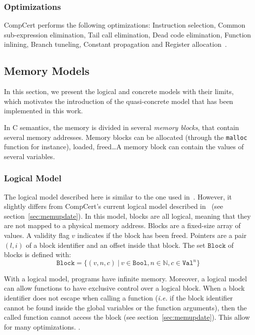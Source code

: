 \subsubsection{Optimizations}
CompCert performs the following optimizations:
Instruction selection, Common sub-expression elimination, Tail call elimination, Dead code elimination, Function inlining, Branch tuneling, Constant propagation and Register allocation~\cite{compcertoverview}.
 

\subsection{Memory Models}
\label{subsec:models}
In this section, we present the logical and concrete models with their limits, which motivates the introduction of the quasi-concrete model that has been implemented in this work.

In C semantics, the memory is divided in several \textit{memory blocks}, that contain several memory addresses. Memory blocks can be allocated (through the \texttt{malloc} function for instance), loaded, freed\dots A memory block can contain the values of several variables. 
\subsubsection{Logical Model}
The logical model described here is similar to the one used in~\cite{DBLP:conf/pldi/KangHMGZV15}. However, it slightly differs from CompCert's current logical model described in~\cite{leroy:hal-00703441} (see section~\ref{sec:memupdate}).
In this model, blocks are all logical, meaning that they are not mapped to a physical memory address.
Blocks are a fixed-size array of values.
A validity flag $v$ indicates if the block has been freed.
Pointers are a pair $(l,i)$ of a block identifier and an offset inside that block.
The set $\texttt{Block}$ of blocks is defined with:
$$\texttt{Block}=\{(v,n,c)~|~v\in\texttt{Bool},n\in\mathbb{N},c\in\texttt{Val}^{n}\}$$

With a logical model, programs have infinite memory.
Moreover, a logical model can allow functions to have exclusive control over a logical block.
When a block identifier does not escape when calling a function (\textit{i.e.} if the block identifier cannot be found inside the global variables or the function arguments), then the called function cannot access the block (see section~\ref{sec:memupdate}).%
This allow for many optimizations. .

